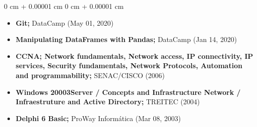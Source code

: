 \documentclass[10pt, letterpaper]{article}
\newenvironment{highlights}{
    \begin{itemize}[
        topsep=0.10 cm,
        parsep=0.10 cm,
        partopsep=0pt,
        itemsep=0pt,
        leftmargin=0 cm + 10pt
    ]
}{
    \end{itemize}
} %
\newenvironment{onecolentry}{
    \begin{adjustwidth}{
        0 cm + 0.00001 cm
    }{
        0 cm + 0.00001 cm
    }
}{
    \end{adjustwidth}
} %
\begin{document}
\begin{onecolentry}
\begin{highlights}
        \item{\textbf{Git;} {DataCamp} (May 01, 2020)}
        
        \item{\textbf{Manipulating DataFrames with Pandas;} {DataCamp} (Jan 14, 2020)}
        
        \item{\textbf{CCNA; Network fundamentals, Network access, IP connectivity, IP services, Security fundamentals, Network Protocols, Automation and programmability;} {SENAC/CISCO} (2006)}
        
        \item{\textbf{Windows 20003Server / Concepts and Infrastructure Network / Infraestruture and Active Directory;} {TREITEC} {(2004)}}
        	
        \item{\textbf{Delphi 6 Basic;} {ProWay Informática} {(Mar 08, 2003)}}
 
            \end{highlights}
        \end{onecolentry}


        \vspace{0.2 cm}

    
\end{document}
